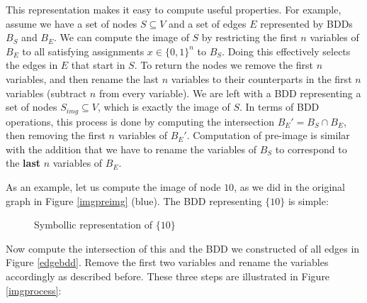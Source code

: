 \documentclass[../master/master.tex]{subfiles}
\begin{document}
This representation makes it easy to compute useful properties. For example, assume we have a set of nodes $S\subseteq V$ and a set of edges $E$ represented by BDDs $B_S$ and $B_E$. We can compute the image of $S$ by restricting the first $n$ variables of $B_E$ to all satisfying assignments $x\in\{0,1\}^{n}$ to $B_S$. Doing this effectively selects the edges in $E$ that start in $S$. To return the nodes we remove the first $n$ variables, and then rename the last $n$ variables to their counterparts in the first $n$ variables (subtract $n$ from every variable). We are left with a BDD representing a set of nodes $S_{img}\subseteq V$, which is exactly the image of $S$. In terms of BDD operations, this process is done by computing the intersection $B_{E}' = B_S\cap B_E$, then removing the first $n$ variables of $B_E'$. Computation of pre-image is similar with the addition that we have to rename the variables of $B_S$ to correspond to the \textbf{last} $n$ variables of $B_E$.

As an example, let us compute the image of node $10$, as we did in the original graph in Figure \ref{imgpreimg} (blue). The BDD representing $\{10\}$ is simple:

\begin{figure}[H]
\center
{}
\caption{Symbollic representation of $\{10\}$}
\end{figure}
Now compute the intersection of this and the BDD we constructed of all edges in Figure \ref{edgebdd}. Remove the first two variables and rename the variables accordingly as described before. These three steps are illustrated in Figure  \ref{imgprocess}:
\end{document}
